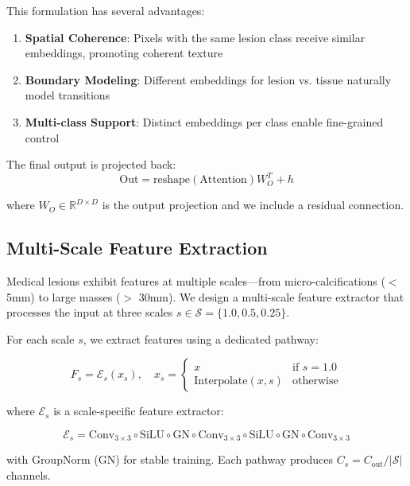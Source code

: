 \documentclass[10pt,twocolumn,letterpaper]{article}
\begin{document}
This formulation has several advantages:
\begin{enumerate}
    \item \textbf{Spatial Coherence}: Pixels with the same lesion class receive similar embeddings, promoting coherent texture
    \item \textbf{Boundary Modeling}: Different embeddings for lesion vs. tissue naturally model transitions
    \item \textbf{Multi-class Support}: Distinct embeddings per class enable fine-grained control
\end{enumerate}

The final output is projected back:
\begin{equation}
\text{Out} = \text{reshape}(\text{Attention}) W_O^T + h
\end{equation}

where $W_O \in \mathbb{R}^{D \times D}$ is the output projection and we include a residual connection.

\subsection{Multi-Scale Feature Extraction}

Medical lesions exhibit features at multiple scales—from micro-calcifications ($<$ 5mm) to large masses ($>$ 30mm). We design a multi-scale feature extractor that processes the input at three scales $s \in \mathcal{S} = \{1.0, 0.5, 0.25\}$.

For each scale $s$, we extract features using a dedicated pathway:

\begin{equation}
F_s = \mathcal{E}_s(x_s), \quad x_s = \begin{cases}
x & \text{if } s = 1.0 \\
\text{Interpolate}(x, s) & \text{otherwise}
\end{cases}
\end{equation}

where $\mathcal{E}_s$ is a scale-specific feature extractor:

\begin{equation}
\mathcal{E}_s = \text{Conv}_{3\times3} \circ \text{SiLU} \circ \text{GN} \circ \text{Conv}_{3\times3} \circ \text{SiLU} \circ \text{GN} \circ \text{Conv}_{3\times3}
\end{equation}

with GroupNorm (GN) for stable training. Each pathway produces $C_s = C_{\text{out}} / |\mathcal{S}|$ channels.
\end{document}
